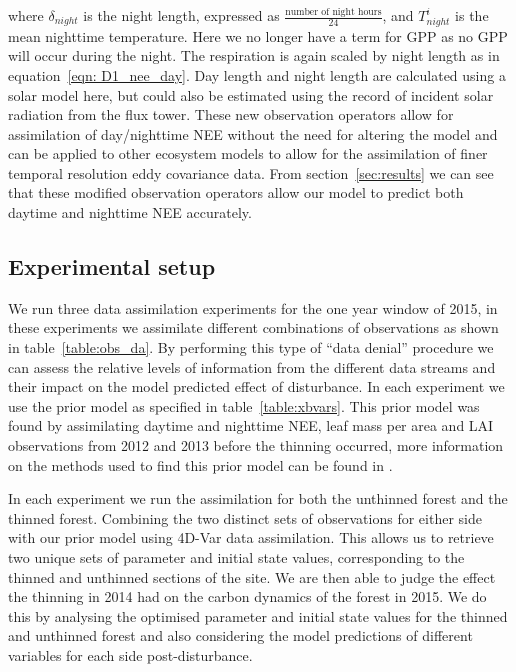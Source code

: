 \documentclass[draft,linenumbers]{agujournal}
\begin{document}
where \(\delta_{night}\) is the night length, expressed as \(\frac{\text{number of night hours}}{24}\), and \(T_{night}^{i}\) is the mean nighttime temperature. Here we no longer have a term for GPP as no GPP will occur during the night. The respiration is again scaled by night length as in equation~\eqref{eqn: D1_nee_day}. Day length and night length are calculated using a solar model here, but could also be estimated using the record of incident solar radiation from the flux tower. These new observation operators allow for assimilation of day/nighttime NEE without the need for altering the model and can be applied to other ecosystem models to allow for the assimilation of finer temporal resolution eddy covariance data. From section~\ref{sec:results} we can see that these modified observation operators allow our model to predict both daytime and nighttime NEE accurately.


\subsection{Experimental setup}


We run three data assimilation experiments for the one year window of 2015, in these experiments we assimilate different combinations of observations as shown in table~\ref{table:obs_da}. By performing this type of ``data denial'' procedure we can assess the relative levels of information from the different data streams and their impact on the model predicted effect of disturbance. In each experiment we use the prior model as specified in table~\ref{table:xbvars}. This prior model was found by assimilating daytime and nighttime NEE, leaf mass per area and LAI observations from 2012 and 2013 before the thinning occurred, more information on the methods used to find this prior model can be found in \citet{Pinnington2016299}.   

In each experiment we run the assimilation for both the unthinned forest and the thinned forest. Combining the two distinct sets of observations for either side with our prior model using 4D-Var data assimilation. This allows us to retrieve two unique sets of parameter and initial state values, corresponding to the thinned and unthinned sections of the site. We are then able to judge the effect the thinning in 2014 had on the carbon dynamics of the forest in 2015. We do this by analysing the optimised parameter and initial state values for the thinned and unthinned forest and also considering the model predictions of different variables for each side post-disturbance. 
\end{document}
